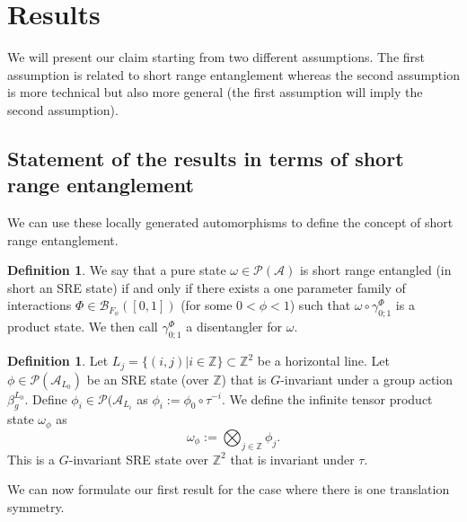 \documentclass[12pt,a4paper,twoside]{article}
\newcommand{\BB}{\mathcal B}
\newcommand{\PP}{\mathcal P}
\newcommand{\ZZ}{\mathbb Z}
\renewcommand{\AA}{\mathcal A}
\theoremstyle{definition}
\newtheorem{definition}[theorem]{Definition}
\numberwithin{equation}{section}
\begin{document}
\section{Results}
We will present our claim starting from two different assumptions. The first assumption is related to short range entanglement whereas the second assumption is more technical but also more general (the first assumption will imply the second assumption).
\subsection{Statement of the results in terms of short range entanglement}\label{sec:Results_1}
We can use these locally generated automorphisms to define the concept of short range entanglement.
\begin{definition}\label{def:sre}
	We say that a pure state $\omega\in\PP(\AA)$ is short range entangled (in short an SRE state) if and only if there exists a one parameter family of interactions $\Phi\in\BB_{F_\phi}([0,1])$ (for some $0<\phi<1$) such that $\omega\circ\gamma^{\Phi}_{0;1}$ is a product state. We then call $\gamma^{\Phi}_{0;1}$ a disentangler for $\omega$.
\end{definition}
\begin{definition}\label{def:InfiniteTensorProduct}
Let $L_j=\{(i,j)|i\in\ZZ\}\subset\ZZ^2$ be a horizontal line. Let $\phi\in\PP(\AA_{L_0})$ be an SRE state (over $\ZZ$) that is $G$-invariant under a group action $\beta_g^{L_0}$. Define $\phi_i\in\PP(\AA_{L_i}$ as $\phi_i:=\phi_0\circ\tau^{-i}$. We define the infinite tensor product state $\omega_\phi$ as
\begin{equation}
\omega_\phi:=\bigotimes_{j\in\ZZ}\phi_j.
\end{equation}
This is a $G$-invariant SRE state over $\ZZ^2$ that is invariant under $\tau$.
\end{definition}
We can now formulate our first result for the case where there is one translation symmetry.
\end{document}
